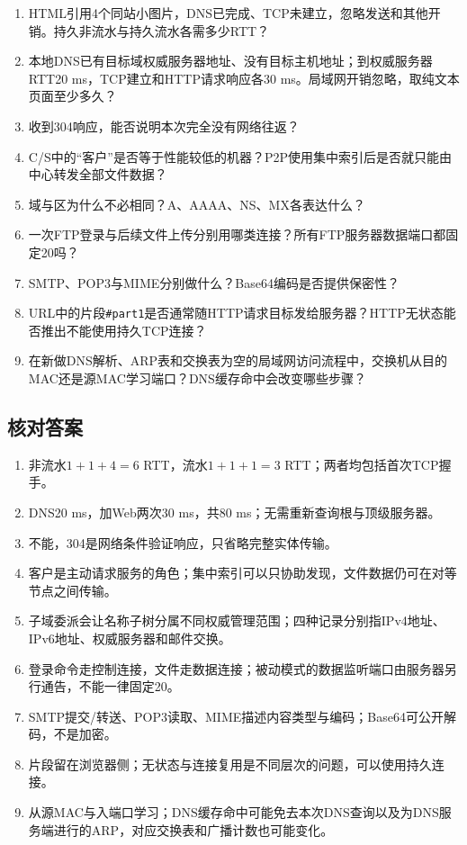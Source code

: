 \begin{enumerate}
\def\labelenumi{\arabic{enumi}.}
\tightlist
\item
  HTML引用4个同站小图片，DNS已完成、TCP未建立，忽略发送和其他开销。持久非流水与持久流水各需多少RTT？
\item
  本地DNS已有目标域权威服务器地址、没有目标主机地址；到权威服务器RTT20 ms，TCP建立和HTTP请求响应各30 ms。局域网开销忽略，取纯文本页面至少多久？
\item
  收到304响应，能否说明本次完全没有网络往返？
\item
  C/S中的``客户''是否等于性能较低的机器？P2P使用集中索引后是否就只能由中心转发全部文件数据？
\item
  域与区为什么不必相同？A、AAAA、NS、MX各表达什么？
\item
  一次FTP登录与后续文件上传分别用哪类连接？所有FTP服务器数据端口都固定20吗？
\item
  SMTP、POP3与MIME分别做什么？Base64编码是否提供保密性？
\item
  URL中的片段\texttt{\#part1}是否通常随HTTP请求目标发给服务器？HTTP无状态能否推出不能使用持久TCP连接？
\item
  在新做DNS解析、ARP表和交换表为空的局域网访问流程中，交换机从目的MAC还是源MAC学习端口？DNS缓存命中会改变哪些步骤？
\end{enumerate}

\subsection{核对答案}\label{CN06-review-answers}

\begin{enumerate}
\def\labelenumi{\arabic{enumi}.}
\tightlist
\item
  非流水\(1+1+4=6\) RTT，流水\(1+1+1=3\) RTT；两者均包括首次TCP握手。
\item
  DNS20 ms，加Web两次30 ms，共80 ms；无需重新查询根与顶级服务器。
\item
  不能，304是网络条件验证响应，只省略完整实体传输。
\item
  客户是主动请求服务的角色；集中索引可以只协助发现，文件数据仍可在对等节点之间传输。
\item
  子域委派会让名称子树分属不同权威管理范围；四种记录分别指IPv4地址、IPv6地址、权威服务器和邮件交换。
\item
  登录命令走控制连接，文件走数据连接；被动模式的数据监听端口由服务器另行通告，不能一律固定20。
\item
  SMTP提交/转送、POP3读取、MIME描述内容类型与编码；Base64可公开解码，不是加密。
\item
  片段留在浏览器侧；无状态与连接复用是不同层次的问题，可以使用持久连接。
\item
  从源MAC与入端口学习；DNS缓存命中可能免去本次DNS查询以及为DNS服务端进行的ARP，对应交换表和广播计数也可能变化。
\end{enumerate}
